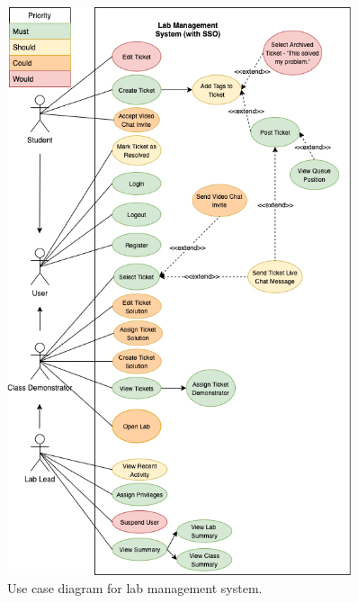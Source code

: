 \begin{figure}[H]
    \centering
    \includegraphics[width=0.9\textwidth]{3requirements/images/useCase.png}
    \caption{Use case diagram for lab management system.}
    \label{fig:useCase}
\end{figure}

